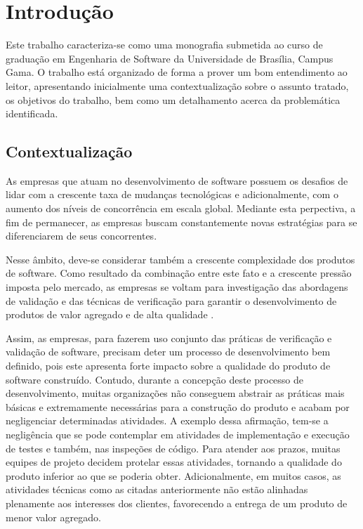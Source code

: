 \chapter{Introdução}

Este trabalho caracteriza-se como uma monografia submetida ao curso de graduação em Engenharia de Software da Universidade de Brasília, Campus Gama. O trabalho está organizado de forma a prover um bom entendimento ao leitor, apresentando inicialmente uma contextualização sobre o assunto tratado, os objetivos do trabalho, bem como um detalhamento acerca da problemática identificada.

\section{Contextualização}

As empresas que atuam no desenvolvimento de software possuem os desafios de lidar com a crescente taxa de mudanças tecnológicas e adicionalmente, com o aumento dos níveis de concorrência em escala global. Mediante esta perpectiva, a fim de permanecer, as empresas buscam constantemente novas estratégias para se diferenciarem de seus concorrentes.

Nesse âmbito, deve-se considerar também a crescente complexidade dos produtos de software. Como resultado da combinação entre este fato e a crescente pressão imposta pelo mercado, as empresas se voltam para investigação das abordagens de validação e das técnicas de verificação para garantir o desenvolvimento de produtos de valor agregado e de alta qualidade \cite{vbse1}.

Assim, as empresas, para fazerem uso conjunto das práticas de verificação e validação de software, precisam deter um processo de desenvolvimento bem definido, pois este apresenta forte impacto sobre a qualidade do produto de software construído. Contudo, durante a concepção deste processo de desenvolvimento, muitas organizações não conseguem abstrair as práticas mais básicas e extremamente necessárias para a construção do produto e acabam por negligenciar determinadas atividades. A exemplo dessa afirmação, tem-se a negligência que se pode contemplar em atividades de implementação e execução de testes e também, nas inspeções de código. Para atender aos prazos, muitas equipes de projeto decidem protelar essas atividades, tornando a qualidade do produto inferior ao que se poderia obter. Adicionalmente, em muitos casos, as atividades técnicas como as citadas anteriormente não estão alinhadas plenamente aos interesses dos clientes, favorecendo a entrega de um produto de menor valor agregado.


